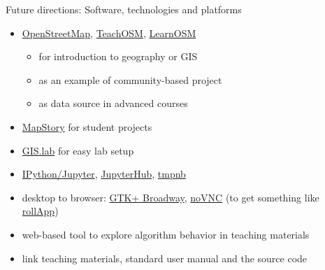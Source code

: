 \documentclass[xcolor={dvipsnames,usenames},beamer]{beamer}
\begin{document}
\begin{frame}{Future directions: Software, technologies and platforms}

\begin{itemize}
 \item \href{http://openstreetmap.org/}{OpenStreetMap},
    \href{http://teachosm.org}{TeachOSM}, \href{http://learnosm.org}{LearnOSM}
 \begin{itemize}
  \item for introduction to geography or GIS
  \item as an example of community-based project
  \item as data source in advanced courses
 \end{itemize}
 \item \href{http://mapstory.org/}{MapStory} {\scriptsize for student projects}
 \item \href{http://imincik.github.io/gis-lab/}{GIS.lab} {\scriptsize for easy lab setup}
 \item \href{http://jupyter.org/}{IPython/Jupyter},
    \href{https://github.com/jupyter/jupyterhub}{JupyterHub},
    \href{https://github.com/jupyter/tmpnb}{tmpnb}
 \item
    desktop to browser:
    \href{https://developer.gnome.org/gtk3/stable/gtk-broadway.html}{GTK+ Broadway},
    \href{https://kanaka.github.io/noVNC/}{noVNC}
    {\tiny (to get something like \href{https://www.rollapp.com/}{rollApp})}
 \item web-based tool to explore algorithm behavior in teaching materials
 \item link teaching materials, standard user manual and the source code
\end{itemize}

\end{frame}
\end{document}
